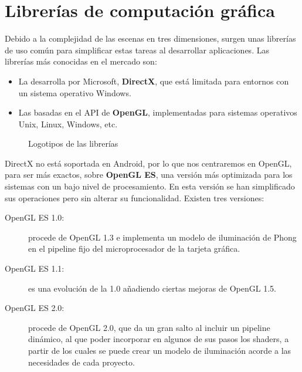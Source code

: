\section{Librerías de computación gráfica}

Debido a la complejidad de las escenas en tres dimensiones, surgen unas librerías de uso común para simplificar estas tareas al desarrollar aplicaciones. Las librerías más conocidas en el mercado son:
\begin{itemize}
\item La desarrolla por Microsoft, \textbf{DirectX}, que está limitada para entornos con un sistema operativo Windows.
\item Las basadas en el API de \textbf{OpenGL}, implementadas para sistemas operativos Unix, Linux, Windows, etc.
\end{itemize}
\begin{figure}[h!]
	\centering	  
	 \hspace*{1cm}
	\caption{Logotipos de las librerías}
\end{figure}

DirectX no está soportada en Android, por lo que nos centraremos en OpenGL, para ser más exactos, sobre \textbf{OpenGL ES}, una versión más optimizada para los sistemas con un bajo nivel de procesamiento. En esta versión se han simplificado sus operaciones pero sin alterar su funcionalidad. Existen tres versiones:
\begin{description}
\item [OpenGL ES 1.0:] procede de OpenGL 1.3 e implementa un modelo de iluminación de Phong en el pipeline fijo del microprocesador de la tarjeta gráfica.
\item [OpenGL ES 1.1:] es una evolución de la 1.0 añadiendo ciertas mejoras de OpenGL 1.5. 
\item [OpenGL ES 2.0:] procede de OpenGL 2.0, que da un gran salto al incluir un pipeline dinámico, al que poder incorporar en algunos de sus pasos los shaders, a partir de los cuales se puede crear un modelo de iluminación acorde a las necesidades de cada proyecto.
\end{description}

